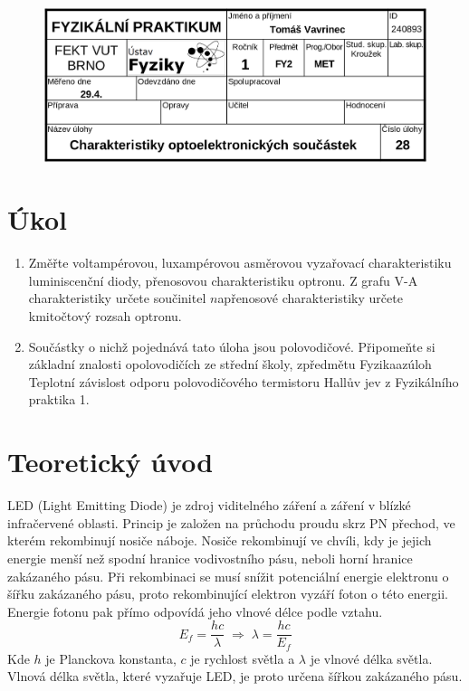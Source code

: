 \documentclass{article}
\begin{document}
\begin{figure}[H]
    \vspace{-15mm}
    \centering
    \includegraphics[width=\textwidth]{hlavička.png}
\end{figure}

\section{Úkol}
\begin{enumerate}
    \footnotesize
    \item Změřte voltampérovou, luxampérovou a\;směrovou vyzařovací charakteristiku luminiscenční diody, přenosovou charakteristiku optronu.
    Z grafu V-A charakteristiky určete součinitel \(n\)\;a\;\;přenosové charakteristiky určete kmitočtový rozsah optronu.

    \item Součástky o nichž pojednává tato úloha jsou polovodičové. 
    Připomeňte si základní znalosti o\;polovodičích ze střední školy, z\;předmětu Fyzika\;a\;z\;úloh Teplotní závislost odporu polovodičového termistoru \;Hallův jev z Fyzikálního praktika 1.
\end{enumerate}

\section{Teoretický úvod}
\footnotesize
LED (Light Emitting Diode) je zdroj viditelného záření a záření v blízké infračervené oblasti.
Princip je založen na průchodu proudu skrz PN přechod, ve kterém rekombinují nosiče náboje.
Nosiče rekombinují ve chvíli, kdy je jejich energie menší než spodní hranice vodivostního pásu, neboli horní hranice zakázaného pásu.
Při rekombinaci se musí snížit potenciální energie elektronu o šířku zakázaného pásu, proto rekombinující elektron vyzáří foton o této energii.
Energie fotonu pak přímo odpovídá jeho vlnové délce podle vztahu.
\begin{equation}
    E_f=\frac{hc}{\lambda}\;\Rightarrow\;\lambda=\frac{hc}{E_f}
    \label{energie_fotonu}
\end{equation}
Kde \(h\) je Planckova konstanta, \(c\) je rychlost světla a \(\lambda\) je vlnové délka světla.
Vlnová délka světla, které vyzařuje LED, je proto určena šířkou zakázaného pásu.
\end{document}
